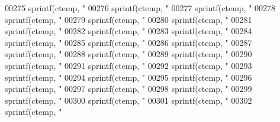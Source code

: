\begin{DoxyCode}
{{{{{{{{{{{{{{{{{{{{{{{{{{{{{{{{{{{{{{{{{{{{{{{{{{{{{{{{{{{{{{{{{{{{{{{{{{{{{{{{{{{{{{{{{{{{{{{{{{{{{{{{{{{{{{{{{{{{{{{{{{{{{{{{{{{{{{{00275     sprintf(ctemp, \textcolor{stringliteral}{"%
00276     sprintf(ctemp, \textcolor{stringliteral}{"%
00277     sprintf(ctemp, \textcolor{stringliteral}{"%
00278     sprintf(ctemp, \textcolor{stringliteral}{"%
00279     sprintf(ctemp, \textcolor{stringliteral}{"%
00280     sprintf(ctemp, \textcolor{stringliteral}{"%
00281     sprintf(ctemp, \textcolor{stringliteral}{"%
00282     sprintf(ctemp, \textcolor{stringliteral}{"%
00283     sprintf(ctemp, \textcolor{stringliteral}{"%
00284     sprintf(ctemp, \textcolor{stringliteral}{"%
00285     sprintf(ctemp, \textcolor{stringliteral}{"%
00286     sprintf(ctemp, \textcolor{stringliteral}{"%
00287     sprintf(ctemp, \textcolor{stringliteral}{"%
00288     sprintf(ctemp, \textcolor{stringliteral}{"%
00289     sprintf(ctemp, \textcolor{stringliteral}{"%
00290     sprintf(ctemp, \textcolor{stringliteral}{"%
00291     sprintf(ctemp, \textcolor{stringliteral}{"%
00292     sprintf(ctemp, \textcolor{stringliteral}{"%
00293     sprintf(ctemp, \textcolor{stringliteral}{"%
00294     sprintf(ctemp, \textcolor{stringliteral}{"%
00295     sprintf(ctemp, \textcolor{stringliteral}{"%
00296     sprintf(ctemp, \textcolor{stringliteral}{"%
00297     sprintf(ctemp, \textcolor{stringliteral}{"%
00298     sprintf(ctemp, \textcolor{stringliteral}{"%
00299     sprintf(ctemp, \textcolor{stringliteral}{"%
00300     sprintf(ctemp, \textcolor{stringliteral}{"%
00301     sprintf(ctemp, \textcolor{stringliteral}{"%
00302     sprintf(ctemp, \textcolor{stringliteral}{"%
}}}}}}}}}}}}}}}}}}}}}}}}}}}}}}}}}}}}}}}}}}}}}}}}}}}}}}}}}}}}}}}}}}}}}}}}}}}}}}}}}}}}}}}}}}}}}}}}}}}}}}}}}}}}}}}}}}}}}}}}}}}}}}}}}}}}}}}}}}}}}}}}}}}}}}}}}}}}}}}}}}}
\end{DoxyCode}

